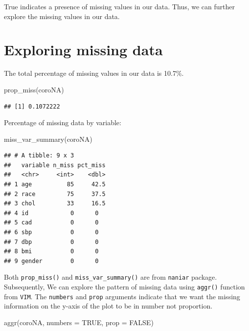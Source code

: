 \documentclass[
  10pt,
]{krantz}
\newenvironment{Shaded}{\begin{snugshade}}{\end{snugshade}}
\newcommand{\AttributeTok}[1]{\textcolor[rgb]{0.77,0.63,0.00}{#1}}
\newcommand{\ConstantTok}[1]{\textcolor[rgb]{0.00,0.00,0.00}{#1}}
\newcommand{\FunctionTok}[1]{\textcolor[rgb]{0.00,0.00,0.00}{#1}}
\newcommand{\NormalTok}[1]{#1}
\begin{document}
True indicates a presence of missing values in our data. Thus, we can further explore the missing values in our data.

\hypertarget{exploring-missing-data}{%
\section{Exploring missing data}\label{exploring-missing-data}}

The total percentage of missing values in our data is 10.7\%.

\begin{Shaded}
\begin{Highlighting}[]
\FunctionTok{prop\_miss}\NormalTok{(coroNA)}
\end{Highlighting}
\end{Shaded}

\begin{verbatim}
## [1] 0.1072222
\end{verbatim}

Percentage of missing data by variable:

\begin{Shaded}
\begin{Highlighting}[]
\FunctionTok{miss\_var\_summary}\NormalTok{(coroNA)}
\end{Highlighting}
\end{Shaded}

\begin{verbatim}
## # A tibble: 9 x 3
##   variable n_miss pct_miss
##   <chr>     <int>    <dbl>
## 1 age          85     42.5
## 2 race         75     37.5
## 3 chol         33     16.5
## 4 id            0      0  
## 5 cad           0      0  
## 6 sbp           0      0  
## 7 dbp           0      0  
## 8 bmi           0      0  
## 9 gender        0      0
\end{verbatim}

Both \texttt{prop\_miss()} and \texttt{miss\_var\_summary()} are from \texttt{naniar} package. Subsequently, We can explore the pattern of missing data using \texttt{aggr()} function from \texttt{VIM}. The \texttt{numbers} and \texttt{prop} arguments indicate that we want the missing information on the y-axis of the plot to be in number not proportion.

\begin{Shaded}
\begin{Highlighting}[]
\FunctionTok{aggr}\NormalTok{(coroNA, }\AttributeTok{numbers =} \ConstantTok{TRUE}\NormalTok{, }\AttributeTok{prop =} \ConstantTok{FALSE}\NormalTok{)}
\end{Highlighting}
\end{Shaded}
\end{document}
